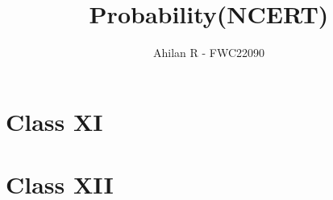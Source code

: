 \documentclass{article}
\begin{document}
\title{Probability(NCERT)}
\author{\Large Ahilan R - FWC22090}
\date{}

\maketitle

\section*{Class XI}


\section*{Class XII}



\end{document}
